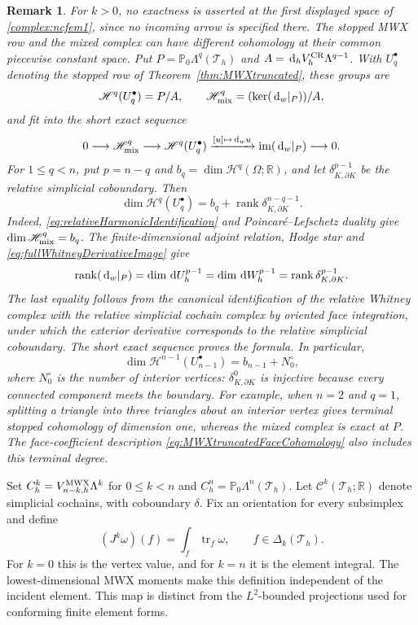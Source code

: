 \documentclass[10pt]{amsart}
\numberwithin{equation}{section}
\newtheorem{remark}[theorem]{Remark}
\newcommand{\dd}{\,{\rm d}}
\newcommand{\tr}{\operatorname{tr}}
\begin{document}
\begin{remark}\label{rem:MWXterminalCohomology}
For $k>0$, no exactness is asserted at the first displayed space of
\eqref{complex:ncfem1}, since no incoming arrow is specified there.
The stopped MWX row and the mixed complex can have different cohomology at
their common piecewise constant space. Put
$P=\mathbb P_0\Lambda^q(\mathcal T_h)$ and
$A=\dd_hV_h^{\rm CR}\Lambda^{q-1}$. With $U_q^\bullet$ denoting the
stopped row of Theorem~\ref{thm:MWXtruncated}, these groups are
\[
\mathscr H^q(U_q^\bullet)=P/A,\qquad
\mathscr H_{\rm mix}^q=(\ker(\dd_w|_P))/A,
\]
and fit into the short exact sequence
\[
0\longrightarrow \mathscr H_{\rm mix}^q\longrightarrow \mathscr H^q(U_q^\bullet)
\xrightarrow{[u]\mapsto\dd_wu}\operatorname{im}(\dd_w|_P)
\longrightarrow0.
\]
For $1\leq q<n$, put $p=n-q$ and
$b_q=\dim \mathscr H^q(\Omega;\mathbb R)$, and let
$\delta_{K,\partial K}^{p-1}$ be the relative simplicial coboundary.
Then
\[
\dim \mathscr H^q(U_q^\bullet)
=b_q+\operatorname{rank}\delta_{K,\partial K}^{n-q-1}.
\]
Indeed, \eqref{eq:relativeHarmonicIdentification} and
Poincar\'e--Lefschetz duality give $\dim \mathscr H_{\rm mix}^q=b_q$.
The finite-dimensional adjoint relation, Hodge star and
\eqref{eq:fullWhitneyDerivativeImage} give
\[
\operatorname{rank}(\dd_w|_P)
=\dim\dd U_h^{p-1}
=\dim\dd W_h^{p-1}
=\operatorname{rank}\delta_{K,\partial K}^{p-1}.
\]
The last equality follows from the canonical
identification of the relative Whitney complex
with the relative simplicial cochain complex
by oriented face integration, under which
the exterior derivative corresponds to the
relative simplicial coboundary.
The short exact sequence proves the formula.
In particular,
\[
\dim \mathscr H^{n-1}(U_{n-1}^\bullet)=b_{n-1}+N_0^\circ,
\]
where $N_0^\circ$ is the number of interior vertices:
$\delta_{K,\partial K}^0$ is injective because every connected
component meets the boundary.
For example, when $n=2$ and $q=1$, splitting a triangle into three triangles
about an interior vertex gives terminal stopped cohomology of dimension one,
whereas the mixed complex is exact at $P$.
The face-coefficient description \eqref{eq:MWXtruncatedFaceCohomology}
also includes this terminal degree.
\end{remark}

Set $C_h^k=V_{n-k,h}^{\rm MWX}\Lambda^k$ for $0\leq k<n$ and
$C_h^n=\mathbb P_0\Lambda^n(\mathcal T_h)$. Let
$\mathcal C^k(\mathcal T_h;\mathbb R)$ denote simplicial cochains, with
coboundary $\delta$. Fix an orientation for every subsimplex and define
\begin{equation}\label{eq:MWXcochainmap}
(J^k\omega)(f)=\int_f\tr_f\omega,
\qquad f\in\Delta_k(\mathcal T_h).
\end{equation}
For $k=0$ this is the vertex value, and for $k=n$ it is the element
integral. The lowest-dimensional MWX moments make this definition
independent of the incident element. This map is distinct from the
$L^2$-bounded projections used for conforming finite element forms.
\end{document}
